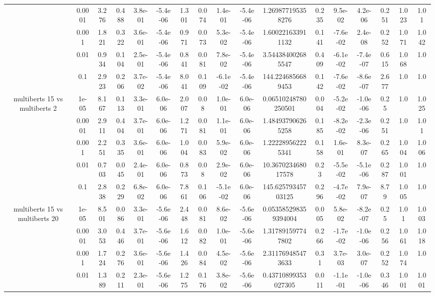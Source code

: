 \begin{tabular}{|c|c|c|c|c|c|c|c|c|c|c|c|c|c|c|c|c|}
 & 0.0001 & 3.276 & 0.488 & 3.8e-01 & -5.4e-06 & 1.301 & 0.074 & 1.4e-01 & -5.4e-06 & 1.269877195358276 & 0.235 & 9.5e-02 & 4.2e-06 & 0.251 & 1.023 & 1.01 \\
 & 0.001 & 1.821 & 0.322 & 3.6e-01 & -5.4e-06 & 0.971 & 0.073 & 5.3e-02 & -5.4e-06 & 1.600221633911132 & 0.141 & -7.6e-02 & 2.4e-08 & 0.252 & 1.071 & 1.042 \\
 & 0.01 & 0.934 & 0.104 & 2.5e-01 & -5.4e-06 & 0.841 & 0.081 & 7.8e-02 & -5.4e-06 & 3.544384002685547 & 0.409 & -6.1e-02 & -7.4e-07 & 0.615 & 1.068 & 1.0 \\
 & 0.1 & 2.923 & 0.206 & 3.7e-02 & -5.4e-06 & 8.041 & 0.109 & -6.1e-02 & -5.4e-06 & 144.2246856689453 & 0.142 & -7.6e-02 & -8.6e-07 & 2.677 & 1.0 & 1.0 \\
\hline
\multirow{5}{*}{multiberts 15 vs multiberts 2} & 1e-05 & 8.167 & 0.113 & 3.3e-01 & 6.0e-06 & 2.007 & 0.08 & 1.0e-01 & 6.0e-06 & 0.06510248780250501 & 0.004 & -5.2e-02 & -1.0e-06 & 0.25 & 1.0 & 1.025 \\
 & 0.0001 & 2.911 & 0.404 & 3.7e-01 & 6.0e-06 & 1.271 & 0.081 & 1.1e-01 & 6.0e-06 & 1.484937906265258 & 0.185 & -8.2e-02 & -2.3e-06 & 0.251 & 1.0 & 1.01 \\
 & 0.001 & 2.251 & 0.335 & 3.6e-01 & 6.0e-06 & 1.004 & 0.083 & 5.9e-02 & 6.0e-06 & 1.222289562225341 & 0.158 & 1.6e-01 & 8.3e-07 & 0.265 & 1.004 & 1.006 \\
 & 0.01 & 0.703 & 0.045 & 2.4e-01 & 6.0e-06 & 0.873 & 0.08 & 2.9e-02 & 6.0e-06 & 10.367023468017578 & 0.23 & -5.5e-02 & -5.1e-06 & 0.287 & 1.001 & 1.0 \\
 & 0.1 & 2.838 & 0.229 & 6.8e-02 & 6.0e-06 & 7.861 & 0.106 & -5.1e-02 & 6.0e-06 & 145.62579345703125 & 0.296 & -4.7e-02 & 7.9e-07 & 8.79 & 1.005 & 1.0 \\
\hline
\multirow{5}{*}{multiberts 15 vs multiberts 20} & 1e-05 & 8.501 & 0.086 & 3.3e-01 & -5.6e-06 & 2.448 & 0.081 & 8.6e-02 & -5.6e-06 & 0.053585298359394004 & 0.005 & 5.8e-02 & -8.2e-07 & 0.25 & 1.01 & 1.003 \\
 & 0.0001 & 3.053 & 0.446 & 3.7e-01 & -5.6e-06 & 1.612 & 0.082 & 1.0e-01 & -5.6e-06 & 1.317891597747802 & 0.266 & -1.7e-02 & -1.0e-06 & 0.256 & 1.061 & 1.018 \\
 & 0.001 & 1.724 & 0.276 & 3.6e-01 & -5.6e-06 & 1.426 & 0.084 & 4.5e-02 & -5.6e-06 & 2.311769485473633 & 0.31 & 3.7e-03 & 3.0e-07 & 0.252 & 1.074 & 1.0 \\
 & 0.01 & 1.389 & 0.211 & 2.3e-01 & -5.6e-06 & 1.275 & 0.176 & 3.8e-02 & -5.6e-06 & 0.43710899353027305 & 0.011 & -1.1e-01 & -1.0e-06 & 0.346 & 1.001 & 1.001 \\

\end{tabular}
